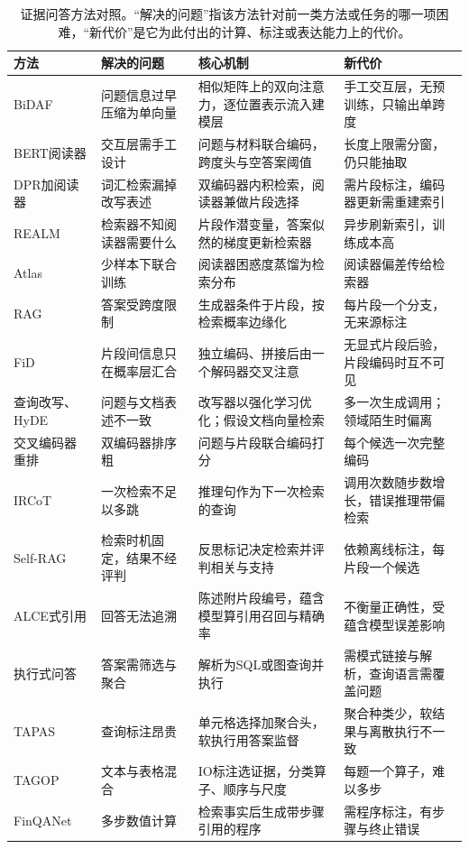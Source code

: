 \begin{table}[htbp]
  \centering
  \small
  \begin{tabularx}{\linewidth}{@{}>{\raggedright\arraybackslash}p{24mm}
    >{\raggedright\arraybackslash}X>{\raggedright\arraybackslash}X
    >{\raggedright\arraybackslash}X@{}}
    \toprule
    方法 & 解决的问题 & 核心机制 & 新代价\\
    \midrule
    BiDAF & 问题信息过早压缩为单向量 & 相似矩阵上的双向注意力，逐位置表示流入建模层 & 手工交互层，无预训练，只输出单跨度\\
    BERT阅读器 & 交互层需手工设计 & 问题与材料联合编码，跨度头与空答案阈值 & 长度上限需分窗，仍只能抽取\\
    DPR加阅读器 & 词汇检索漏掉改写表述 & 双编码器内积检索，阅读器兼做片段选择 & 需片段标注，编码器更新需重建索引\\
    REALM & 检索器不知阅读器需要什么 & 片段作潜变量，答案似然的梯度更新检索器 & 异步刷新索引，训练成本高\\
    Atlas & 少样本下联合训练 & 阅读器困惑度蒸馏为检索分布 & 阅读器偏差传给检索器\\
    RAG & 答案受跨度限制 & 生成器条件于片段，按检索概率边缘化 & 每片段一个分支，无来源标注\\
    FiD & 片段间信息只在概率层汇合 & 独立编码、拼接后由一个解码器交叉注意 & 无显式片段后验，片段编码时互不可见\\
    查询改写、HyDE & 问题与文档表述不一致 & 改写器以强化学习优化；假设文档向量检索 & 多一次生成调用；领域陌生时偏离\\
    交叉编码器重排 & 双编码器排序粗 & 问题与片段联合编码打分 & 每个候选一次完整编码\\
    IRCoT & 一次检索不足以多跳 & 推理句作为下一次检索的查询 & 调用次数随步数增长，错误推理带偏检索\\
    Self-RAG & 检索时机固定，结果不经评判 & 反思标记决定检索并评判相关与支持 & 依赖离线标注，每片段一个候选\\
    ALCE式引用 & 回答无法追溯 & 陈述附片段编号，蕴含模型算引用召回与精确率 & 不衡量正确性，受蕴含模型误差影响\\
    执行式问答 & 答案需筛选与聚合 & 解析为SQL或图查询并执行 & 需模式链接与解析，查询语言需覆盖问题\\
    TAPAS & 查询标注昂贵 & 单元格选择加聚合头，软执行用答案监督 & 聚合种类少，软结果与离散执行不一致\\
    TAGOP & 文本与表格混合 & IO标注选证据，分类算子、顺序与尺度 & 每题一个算子，难以多步\\
    FinQANet & 多步数值计算 & 检索事实后生成带步骤引用的程序 & 需程序标注，有步骤与终止错误\\
    \bottomrule
  \end{tabularx}
  \caption{证据问答方法对照。“解决的问题”指该方法针对前一类方法或任务的哪一项困难，“新代价”是它为此付出的计算、标注或表达能力上的代价。}
  \label{tab:nlp-dialogue-evidence-methods}
\end{table}

